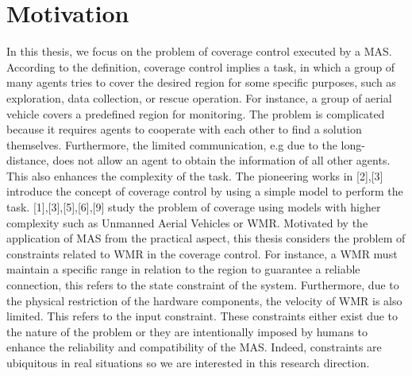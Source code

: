 \section{Motivation}
In this thesis, we focus on the problem of coverage control executed by a MAS. According to the definition, coverage control implies a task, in which a group of many agents tries to cover the desired region for some specific purposes, such as exploration, data collection, or rescue operation. For instance, a group of aerial vehicle covers a predefined region for monitoring.
The problem is complicated because it requires agents to cooperate with each other to find a solution themselves. Furthermore, the limited communication, e.g due to the long-distance, does not allow an agent to obtain the information of all other agents. This also enhances the complexity of the task. The pioneering works in [2],[3] introduce the concept of coverage control by using a simple model to perform the task. [1],[3],[5],[6],[9] study the problem of coverage using models with higher complexity such as Unmanned Aerial Vehicles or WMR. 
Motivated by the application of MAS from the practical aspect, this thesis considers the problem of constraints related to WMR in the coverage control. For instance, a WMR must maintain a specific range in relation to the region to guarantee a reliable connection, this refers to the state constraint of the system. Furthermore, due to the physical restriction of the hardware components, the velocity of WMR is also limited. This refers to the input constraint. These constraints either exist due to the nature of the problem or they are intentionally imposed by humans to enhance the reliability and compatibility of the MAS. Indeed, constraints are ubiquitous in real situations so we are interested in this research direction.\\

